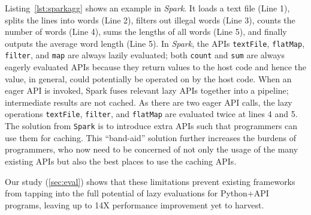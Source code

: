 \documentclass[sigconf]{acmart}\settopmatter{printfolios=true,printccs=false,printacmref=false}\setcopyright{none}
\newcommand {\REV}[1]{#1}
\begin{document}
Listing~\ref{lst:sparkagg} shows an example in {\em Spark}. It loads a text file (Line 1), splits the lines into words (Line 2), filters out illegal words (Line 3), counts the number of words (Line 4), sums the lengths of all words (Line 5), and finally outputs the average word length (Line 5). In {\em Spark}, the APIs \texttt{textFile}, \texttt{flatMap}, \texttt{filter}, and \texttt{map} are always lazily evaluated; both \texttt{count} and \texttt{sum} are always eagerly evaluated APIs \REV{because they return values to the host code and hence the value, in general, could potentially be operated on by the host code.} 
When an eager API is invoked, Spark fuses relevant lazy APIs together into a pipeline; intermediate results are not cached. As there are two eager API calls, the lazy operations \texttt{textFile}, \texttt{filter}, and \texttt{flatMap} are evaluated twice at lines 4 and 5. The solution from \texttt{Spark} is to introduce extra APIs such that programmers can use them for caching. This ``band-aid'' solution further increases the burdens of programmers, who now need to be concerned of not only the usage of the many existing APIs but also the best places to use the caching APIs. 



Our study (\cref{sec:eval}) shows that these limitations prevent existing frameworks from tapping into the full potential of lazy evaluations for Python+API programs, leaving up to 14X performance improvement yet to harvest. 


\end{document}
